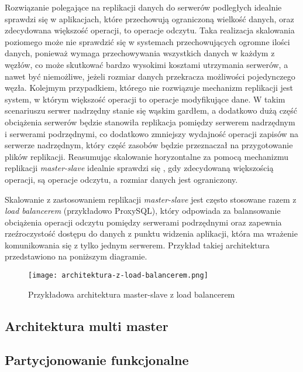 Rozwiązanie polegające na replikacji danych do serwerów podległych idealnie sprawdzi się w aplikacjach, które przechowują ograniczoną wielkość danych, oraz zdecydowana większość operacji, to operacje odczytu. Taka realizacja skalowania poziomego może nie sprawdzić się w systemach przechowujących ogromne ilości danych, ponieważ wymaga przechowywania wszystkich danych w każdym z węzłów, co może skutkować bardzo wysokimi kosztami utrzymania serwerów, a nawet być niemożliwe, jeżeli rozmiar danych przekracza możliwości pojedynczego węzła. Kolejmym przypadkiem, którego nie rozwiązuje mechanizm replikacji jest system, w którym większość operacji to operacje modyfikujące dane. W takim scenariuszu serwer nadrzędny stanie się wąskim gardłem, a dodatkowo dużą część obciążenia serwerów będzie stanowiła replikacja pomiędzy serwerem nadrzędnym i serwerami podrzędnymi, co dodatkowo zmniejszy wydajność operacji zapisów na serwerze nadrzędnym, który część zasobów będzie przeznaczał na przygotowanie plików replikacji. Reasumując skalowanie horyzontalne za pomocą mechanizmu replikacji \textit{master-slave} idealnie sprawdzi się , gdy zdecydowaną większością operacji, są operacje odczytu, a rozmiar danych jest ograniczony.

Skalowanie z zastosowaniem replikacji \textit{master-slave} jest często stosowane razem z \textit{load balancerem} (przykładowo ProxySQL), który odpowiada za balansowanie obciążenia operacji odczytu pomiędzy serwerami podrzędnymi oraz zapewnia rzeźroczystość dostępu do danych z punktu widzenia aplikacji, która ma wrażenie komunikowania się z tylko jednym serwerem. Przykład takiej architektura przedstawiono na poniższym diagramie.

\begin{figure}[!h]
	\caption{Przykładowa architektura master-slave z load balancerem}
	\centering
	\texttt{[image: architektura-z-load-balancerem.png]}
	\label{fig:label}
\end{figure}

\subsection{Architektura multi master}


\subsection{Partycjonowanie funkcjonalne}

